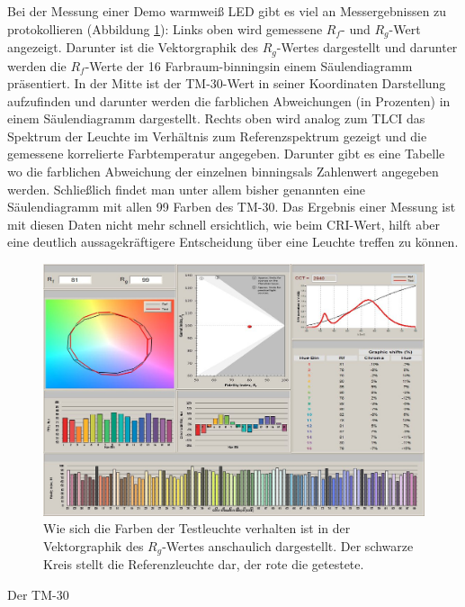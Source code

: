 Bei der Messung einer Demo warmweiß LED gibt es viel an Messergebnissen zu protokollieren (Abbildung \ref{b_tm304}): Links oben wird gemessene $R_{f}$- und $R_{g}$-Wert angezeigt. Darunter ist die Vektorgraphik des $R_{g}$-Wertes dargestellt und darunter werden die $R_{f}$-Werte der 16 Farbraum-\glqq binnings\grqq  in einem Säulendiagramm präsentiert. In der Mitte ist der TM-30-Wert in seiner Koordinaten Darstellung aufzufinden und darunter werden die farblichen Abweichungen (in Prozenten) in einem Säulendiagramm dargestellt. Rechts oben wird analog zum TLCI das Spektrum der Leuchte im Verhältnis zum Referenzspektrum gezeigt und die gemessene korrelierte Farbtemperatur angegeben. Darunter gibt es eine Tabelle wo die farblichen Abweichung der einzelnen \glqq binnings\grqq als Zahlenwert angegeben werden. Schließlich findet man unter allem bisher genannten eine Säulendiagramm mit allen 99 Farben des TM-30. 
Das Ergebnis einer Messung ist mit diesen Daten nicht mehr schnell ersichtlich, wie beim CRI-Wert, hilft aber eine deutlich aussagekräftigere Entscheidung über eine Leuchte treffen zu können. 

\begin{figure}[H]     %
\centering
\includegraphics[width=1.0\textwidth]{bilder/tm304} 
\caption {Wie sich die Farben der Testleuchte verhalten ist in der Vektorgraphik des $R_{g}$-Wertes anschaulich dargestellt. Der schwarze Kreis stellt die Referenzleuchte dar, der rote die getestete.  \protect\footnotemark}\label{b_tm304}
\end{figure}

Der TM-30 

